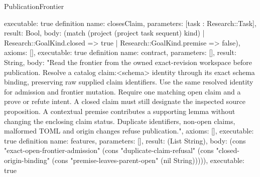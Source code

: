 \begin{lexlean}{PublicationFrontier}
\begin{semanticmodule}
{ executable: true
}
definition{
 name: closesClaim,
 parameters: [task : Research::Task],
 result: Bool,
 body: (match (project (project task sequent) kind) | Research::GoalKind.closed => true | Research::GoalKind.premise => false),
 axioms: [],
 executable: true
}
definition{
 name: contract,
 parameters: [],
 result: String,
 body: "Read the frontier from the owned exact-revision workspace before publication. Resolve a catalog claim:<schema> identity through its exact schema binding, preserving raw supplied claim identifiers. Use the same resolved identity for admission and frontier mutation. Require one matching open claim and a prove or refute intent. A closed claim must still designate the inspected source proposition. A contextual premise contributes a supporting lemma without changing the enclosing claim status. Duplicate identifiers, non-open claims, malformed TOML and origin changes refuse publication.",
 axioms: [],
 executable: true
}
definition{
 name: features,
 parameters: [],
 result: (List String),
 body: (cons "exact-open-frontier-admission" (cons "duplicate-claim-refusal" (cons "closed-origin-binding" (cons "premise-leaves-parent-open" (nil String))))),
 executable: true
}
\end{semanticmodule}
\end{lexlean}
